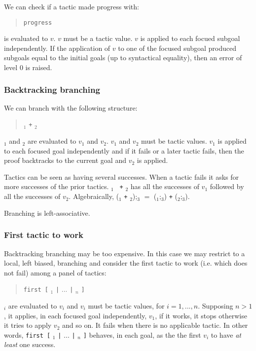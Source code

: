 We can check if a tactic made progress with:
\begin{quote}
{\tt progress} {\tacexpr}
\end{quote}
{\tacexpr} is evaluated to $v$. $v$ must be a tactic value. $v$ is
applied to each focued subgoal independently. If the application of
$v$ to one of the focused subgoal produced subgoals equal to the
initial goals (up to syntactical equality), then an error of level 0
is raised.

\ErrMsg {}

\subsubsection[Backtracking branching]{Backtracking branching\tacindex{$+$}
}

We can branch with the following structure:
\begin{quote}
{\tacexpr}$_1$ {\tt +} {\tacexpr}$_2$
\end{quote}
{\tacexpr}$_1$ and {\tacexpr}$_2$ are evaluated to $v_1$ and
$v_2$. $v_1$ and $v_2$ must be tactic values. $v_1$ is applied to each
focused goal independently and if it fails or a later tactic fails,
then the proof backtracks to the current goal and $v_2$ is applied.

Tactics can be seen as having several successes. When a tactic fails
it asks for more successes of the prior tactics. {\tacexpr}$_1$ {\tt
  +} {\tacexpr}$_2$ has all the successes of $v_1$ followed by all the
successes of $v_2$. Algebraically, ({\tacexpr}$_1$ {\tt +}
{\tacexpr}$_2$);{\tacexpr}$_3$ $=$ ({\tacexpr}$_1$;{\tacexpr}$_3$)
{\tt +} ({\tacexpr}$_2$;{\tacexpr}$_3$).

Branching is left-associative.

\subsubsection[First tactic to work]{First tactic to work
}

Backtracking branching may be too expensive. In this case we may
restrict to a local, left biased, branching and consider the first
tactic to work (i.e. which does not fail) among a panel of tactics:
\begin{quote}
{\tt first [} {\tacexpr}$_1$ {\tt |} $...$ {\tt |} {\tacexpr}$_n$ {\tt ]}
\end{quote}
{\tacexpr}$_i$ are evaluated to $v_i$ and $v_i$ must be tactic values,
for $i=1,...,n$. Supposing $n>1$, it applies, in each focused goal
independently, $v_1$, if it works, it stops otherwise it tries to
apply $v_2$ and so on. It fails when there is no applicable tactic. In
other words, {\tt first [} {\tacexpr}$_1$ {\tt |} $...$ {\tt |}
  {\tacexpr}$_n$ {\tt ]} behaves, in each goal, as the the first $v_i$
to have \emph{at least} one success.

